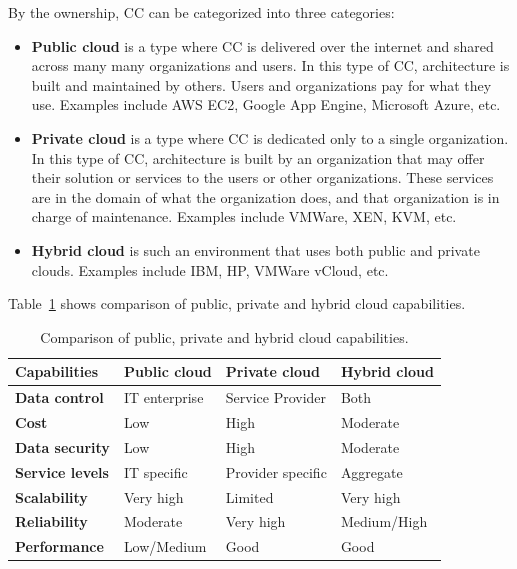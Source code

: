 By the ownership, CC can be categorized into three categories:

\begin{itemize}
	\item \textbf{Public cloud} is a type where CC is delivered over the internet and shared across many many organizations and users. In this type of CC, architecture is built and maintained by others. Users and organizations pay for what they use. Examples include AWS EC2, Google App Engine, Microsoft Azure, etc.
	\item \textbf{Private cloud} is a type where CC is dedicated only to a single organization. In this type of CC, architecture is built by an organization that may offer their solution or services to the users or other organizations. These services are in the domain of what the organization does, and that organization is in charge of maintenance. Examples include VMWare, XEN, KVM, etc.
	\item \textbf{Hybrid cloud} is such an environment that uses both public and private clouds. Examples include IBM, HP, VMWare vCloud, etc.
\end{itemize}

\noindent
Table~\ref{tab:table4} shows comparison of public, private and hybrid cloud capabilities.\label{sec_types}

\begin{table}[h!]
	\begin{center}
		\begin{tabular}{l|l|l|l}
			\textbf{Capabilities} & \textbf{Public cloud} & \textbf{Private cloud} & \textbf{Hybrid cloud}\\
			\hline
			\textbf{Data control} & IT enterprise & Service Provider & Both \\
			\textbf{Cost} & Low & High & Moderate \\
			\textbf{Data security} & Low & High & Moderate \\
			\textbf{Service levels} & IT specific & Provider specific & Aggregate \\
			\textbf{Scalability} & Very high & Limited & Very high \\	
			\textbf{Reliability} & Moderate & Very high & Medium/High\\	
			\textbf{Performance} & Low/Medium & Good & Good \\
\end{tabular}
	\end{center}
	\vspace{-0.5cm}
	\caption{Comparison of public, private and hybrid cloud capabilities.}
	\label{tab:table4}
\end{table}

